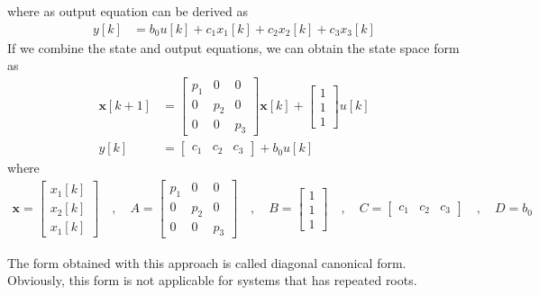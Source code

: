 \documentclass[twoside]{article}
\begin{document}
%
where as output equation can be derived as
%
\begin{align*}
y[k] &= b_0 u[k] + c_1 x_1[k] + c_2 x_2[k] + c_3 x_3[k]
\end{align*}
%
If we combine the state and output equations, we
can obtain the state space form as
%
%
\begin{align*}
  \mathbf{x}[k+1] &= \left[ \begin{array}{ccc} p_1 & 0 & 0\\ 0 & p_2 & 0
    \\ 0 & 0 & p_3 \end{array} \right] \mathbf{x}[k]
   + 
  \left[ \begin{array}{c} 1 \\ 1
    \\ 1 \end{array} \right] u[k]
\\
y[k] &= \left[ \begin{array}{ccc} c_1 & c_2 & c_3 \end{array} \right]
+ b_0 u[k]
\end{align*}
%
where 
%
\begin{align*}
\mathbf{x} = \left[ \begin{array}{c} x_1[k] \\ x_2[k] \\
x_1[k] \end{array} \right] \quad , \quad
A = \left[ \begin{array}{ccc} p_1 & 0 & 0 \\ 0 & p_2 & 0
    \\ 0 & 0 & p_3 \end{array} \right]
\quad , \quad 
B = \left[ \begin{array}{c} 1 \\ 1
    \\ 1 \end{array} \right]
\quad , \quad
C = \left[ \begin{array}{ccc} c_1 & c_2 & c_3 \end{array} \right]
\quad , \quad
D = b_0
\end{align*}
%

The form obtained with this approach is called
diagonal canonical form. Obviously, this form is
not applicable for systems that has repeated roots.
\end{document}
